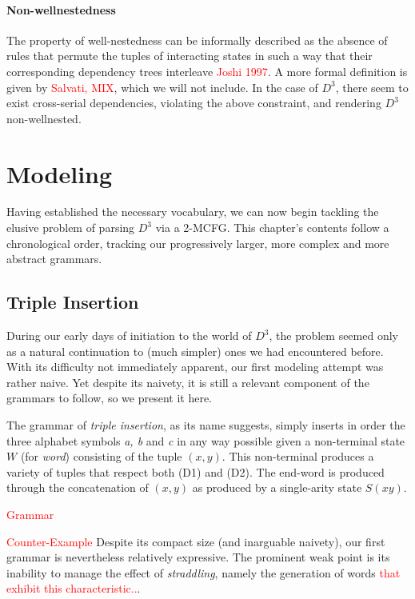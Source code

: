 \documentclass[nonatbib,numbers,10pt]{sigplanconf}
\newcommand\todo[1]{\textcolor{red}{#1}}
\begin{document}
\paragraph{Non-wellnestedness}
The property of well-nestedness can be informally described as the absence of rules that permute the tuples of interacting states in such a way that their corresponding dependency trees interleave \todo{Joshi 1997}. A more formal definition is given by \todo{Salvati, MIX}, which we will not include. In the case of $D^3$, there seem to exist cross-serial dependencies, violating the above constraint, and rendering $D^3$ non-wellnested.

\section{Modeling}
Having established the necessary vocabulary, we can now begin tackling the elusive problem of parsing $D^3$ via a 2-MCFG. This chapter's contents follow a chronological order, tracking our progressively larger, more complex and more abstract grammars.
\subsection{Triple Insertion}
During our early days of initiation to the world of $D^3$, the problem seemed only as a natural continuation to (much simpler) ones we had encountered before. With its difficulty not immediately apparent, our first modeling attempt was rather naive. Yet despite its naivety, it is still a relevant component of the grammars to follow, so we present it here.

The grammar of \textit{triple insertion}, as its name suggests, simply inserts in order the three alphabet symbols \textit{a, b} and \textit{c} in any way possible given a non-terminal state $W$ (for \textit{word}) consisting of the tuple $(x,y)$. This non-terminal produces a variety of tuples that respect both (D1) and (D2). The end-word is produced through the concatenation of $(x,y)$ as produced by a single-arity state $S(xy)$.

\todo{Grammar}

\todo{Counter-Example}
Despite its compact size (and inarguable naivety), our first grammar is nevertheless relatively expressive. The prominent weak point is its inability to manage the effect of \textit{straddling}, namely the generation of words \todo{that exhibit this characteristic..}.
\end{document}
